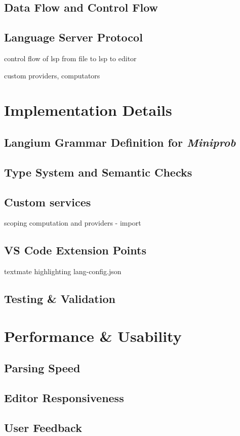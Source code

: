 \section{Data Flow and Control Flow}

\section{Language Server Protocol}
control flow of lsp from file to lsp to editor

custom providers, computators

\chapter{Implementation Details}
\label{sec:langium-grammar}
\section{Langium Grammar Definition for \textit{Miniprob}}
\section{Type System and Semantic Checks}
\section*{Custom services}
scoping computation and providers - import
\section{VS Code Extension Points}
textmate highlighting lang-config.json
\section{Testing \& Validation}

\chapter{Performance \& Usability}
\section{Parsing Speed}
\section{Editor Responsiveness}
\section{User Feedback}